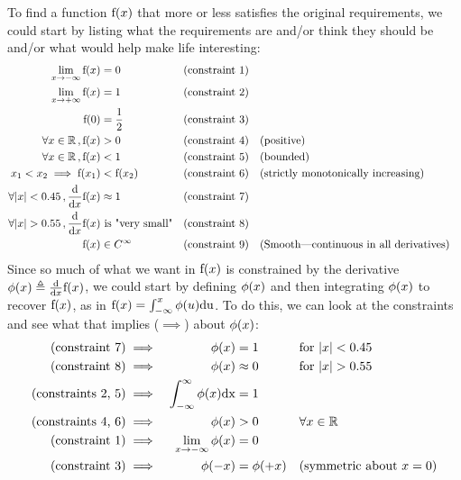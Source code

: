 To find a function $\mathrm{f}(x)$ that more or less satisfies the original requirements, we could start by listing what the requirements are and/or think they should be and/or what would help make life interesting:
$$\begin{align*}
    \lim_{x\to-\infty}\ff(x) &= 0 
       && \text{(constraint 1)}
  \\\lim_{x\to+\infty}\ff(x) &= 1
       && \text{(constraint 2)}
  \\\ff(0) &= \frac{1}{2}
       && \text{(constraint 3)}
   \\\forall x\in\R\,,\ff(x) &> 0
       &&  \text{(constraint 4)}
       && \text{(positive)}
   \\\forall x\in\R\,,\ff(x) &< 1
       &&  \text{(constraint 5)}
       && \text{(bounded)}
   \\x_1<x_2\implies \ff(x_1)&<\ff(x_2)
       && \text{(constraint 6)}
       && \text{(strictly monotonically increasing)}
   \\\forall \abs{x}<0.45\,,\deriv{}{x}\ff(x) &\eqa 1
       &&  \text{(constraint 7)}
   \\\forall |x|>0.55\,,\deriv{}{x}\ff(x) &\text{ is "very small"}
       &&  \text{(constraint 8)}
   \\\ff(x)&\in C^{\infty}
       &&  \text{(constraint 9)}
       && \text{(Smooth---continuous in all derivatives)}
\end{align*}$$
Since so much of what we want in $\mathrm{f}(x)$ is constrained by the derivative 
$\mathrm{\phi}(x)\triangleq{\frac{\mathrm{d}}{\mathrm{d}x} }\mathrm{f}(x)$, we could start by defining $\mathrm{\phi}(x)$ and then integrating $\mathrm{\phi}(x)$ to recover $\mathrm{f}(x)$, 
as in $\mathrm{f}(x)=\int_{-\infty}^x\mathrm{\phi}(u)\mathrm{du}$. 
To do this, we can look at the constraints and see what that implies ($\implies$) about $\mathrm{\phi}(x)$:
\begin{align*}
    \text{(constraint 7)} &\implies &\mathrm{\phi}(x) &= 1    && \text{for ${\left\lvert x \right\rvert}<0.45$}
  \\\text{(constraint 8)} &\implies &\mathrm{\phi}(x) &\approx 0 && \text{for ${\left\lvert x \right\rvert}>0.55$}
  \\\text{(constraints 2, 5)} &\implies &\int_{-\infty}^{\infty}\mathrm{\phi}(x)\mathrm{dx} &=1
  \\\text{(constraints 4, 6)} &\implies &\mathrm{\phi}(x) &> 0 && \forall x\in\Bbb{R}
  \\\text{(constraint 1)} &\implies &\lim_{x\to-\infty}\mathrm{\phi}(x) &=0 
  \\\text{(constraint 3)} &\implies &\mathrm{\phi}(-x)&=\mathrm{\phi}(+x) && \text{(symmetric about $x=0$)}
\end{align*}

